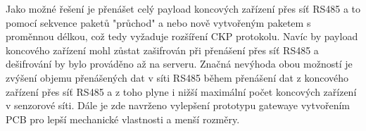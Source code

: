 Jako možné řešení je přenášet celý payload koncových zařízení přes síť RS485 a to pomocí sekvence paketů "průchod" a nebo nově vytvořeným paketem s proměnnou délkou, což tedy vyžaduje rozšíření CKP protokolu. Navíc by payload koncového zařízení mohl zůstat zašifrován při přenášení přes síť RS485 a dešifrování by bylo prováděno až na serveru.
Značná nevýhoda obou možností je zvýšení objemu přenášených dat v síti RS485 během přenášení dat z koncového zařízení přes síť RS485 a z toho plyne i nižší maximální počet koncových zařízení v senzorové síti.
Dále je zde navrženo vylepšení prototypu gatewaye vytvořením PCB pro lepší mechanické vlastnosti a menší rozměry.










